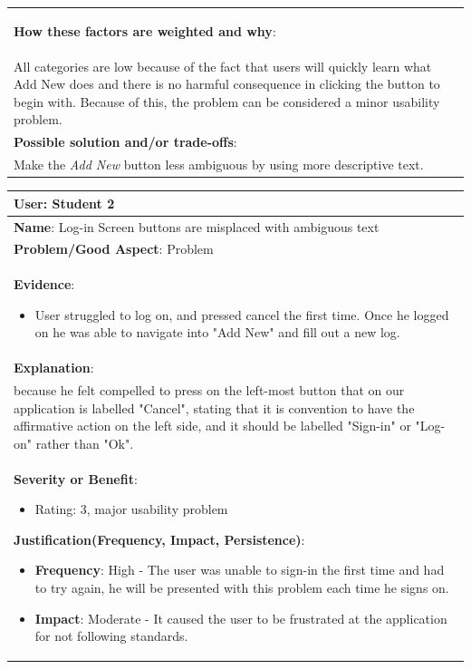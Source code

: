 \documentclass[pdftex,12pt,a4paper]{report}
\begin{document}
\begin{center}
\begin{tabular}{|p{\textwidth}|}
\begin{itemize}
	\end{itemize}
	\textbf{How these factors are weighted and why}:\\
	All categories are low because of the fact that users will quickly learn what Add New does and there is no harmful consequence in clicking the button to begin with. Because of this, the problem can be considered a minor usability problem.\\
	\hline
	\textbf{Possible solution and/or trade-offs}:\\
	Make the \emph{Add New} button less ambiguous by using more descriptive text.\\
	\hline
	\end{tabular}
\end{center}

\begin{center}
	\begin{tabular}{|p{\textwidth}|}
	\hline
	\textbf{User}: Student 2\\
	\hline
	\textbf{Name}: Log-in Screen buttons are misplaced with ambiguous text\\
	\hline
	\textbf{Problem/Good Aspect}: Problem\\
	\hline
	\textbf{Evidence}:
	\begin{itemize}
	\item{User struggled to log on, and pressed cancel the first time. Once he logged on he was able to navigate into "Add New" and fill out a new log.}
	\end{itemize}\\
	\hline
	\textbf{Explanation}:\\
	because he felt compelled to press on the left-most button that on our application is labelled "Cancel", stating that it is convention to have the affirmative action on the left side, and it should be labelled "Sign-in" or "Log-on" rather than "Ok".\\
	\hline
	\textbf{Severity or Benefit}:
	\begin{itemize}
	\item{Rating: 3, major usability problem}
	\end{itemize}
	\textbf{Justification(Frequency, Impact, Persistence)}:
	\begin{itemize}
	\item{\textbf{Frequency}:} High - The user was unable to sign-in the first time and had to try again, he will be presented with this problem each time he signs on.
	\item{\textbf{Impact}:} Moderate - It caused the user to be frustrated at the application for not following standards.

\end{itemize}
\end{tabular}
\end{center}
\end{document}
